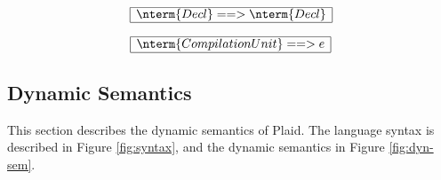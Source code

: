 \[
  \begin{array}{|c|}
  \hline
  \nterm{Decl} ==> \nterm{Decl}\\
  \hline
  \end{array}
\]

\[
  \begin{array}{|c|}
  \hline
  \nterm{CompilationUnit} ==> e\\
  \hline
  \end{array}
\]

%
%
%
%
%
%
%
%
%
%
%
%
%
%
%
%
%
%
%
%
%
%
%
%

\subsection{Dynamic Semantics}

This section describes the dynamic semantics of Plaid. The language syntax is described in Figure \ref{fig:syntax}, and the dynamic semantics in Figure \ref{fig:dyn-sem}.

